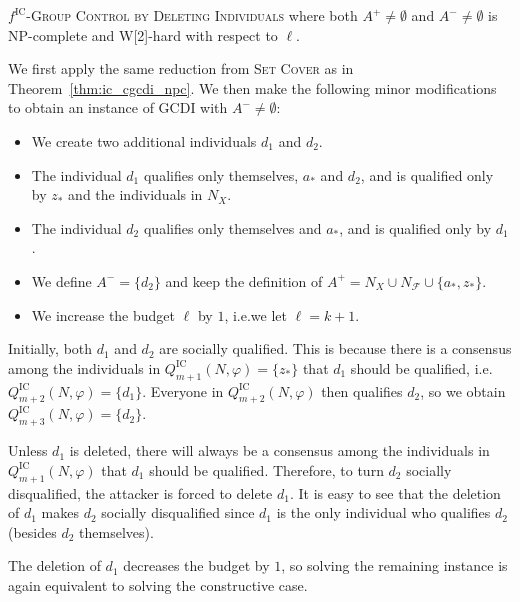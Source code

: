 \documentclass[
    12pt,               %
    a4paper,            %
    bibtotoc,           %
    pointlessnumbers,   %
    ngerman,            %
    titlepage,          %
    leqno,              %
    ]{scrarticle}       %
\newcommand\thmref{Theorem~\ref}
\begin{document}
\begin{Corollary} \label{cor:ic_gcdi_npc}
$f^{\text{IC}}$-\textsc{Group Control by Deleting Individuals} where both $A^+ \neq \emptyset$ and $A^- \neq \emptyset$ is NP-complete and W[2]-hard with respect to $\ell$.
\end{Corollary}

\begin{Proof}
We first apply the same reduction from \textsc{Set Cover} as in \thmref{thm:ic_cgcdi_npc}. We then make the following minor modifications to obtain an instance of GCDI with $A^- \neq \emptyset$:

\begin{itemize}[nolistsep]
\item
We create two additional individuals $d_1$ and $d_2$.
\item
The individual $d_1$ qualifies only themselves, $a_\ast$ and $d_2$, and is qualified only by $z_\ast$ and the individuals in $N_X$.
\item
The individual $d_2$ qualifies only themselves and $a_\ast$, and is qualified only by $d_1$.
\item
We define $A^- = \{d_2\}$ and keep the definition of $A^+ = N_X \cup N_\mathcal{F} \cup \{ a_\ast, z_\ast \}$.
\item
We increase the budget $\ell$ by $1$, i.e.\@ we let $\ell = k+1$.
\end{itemize}

Initially, both $d_1$ and $d_2$ are socially qualified. This is because there is a consensus among the individuals in $Q^{\text{IC}}_{m+1}(N, \varphi) = \{z_\ast\}$ that $d_1$ should be qualified, i.e.\@ $Q^{\text{IC}}_{m+2}(N, \varphi) = \{d_1\}$. Everyone in $Q^{\text{IC}}_{m+2}(N, \varphi)$ then qualifies $d_2$, so we obtain $Q^{\text{IC}}_{m+3}(N, \varphi) = \{d_2\}$.

Unless $d_1$ is deleted, there will always be a consensus among the individuals in $Q^{\text{IC}}_{m+1}(N, \varphi)$ that $d_1$ should be qualified. Therefore, to turn $d_2$ socially disqualified, the attacker is forced to delete $d_1$. It is easy to see that the deletion of $d_1$ makes $d_2$ socially disqualified since $d_1$ is the only individual who qualifies $d_2$ (besides $d_2$ themselves).

The deletion of $d_1$ decreases the budget by $1$, so solving the remaining instance is again equivalent to solving the constructive case.
\end{Proof}
\end{document}

